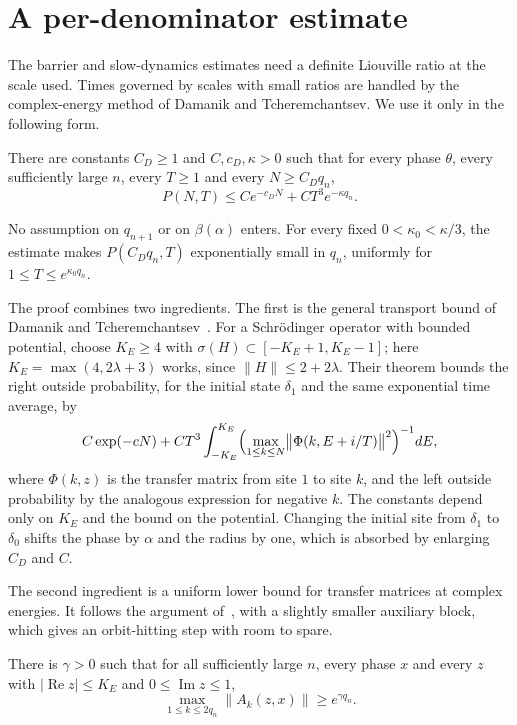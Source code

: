 \section{A per-denominator estimate}\label{sec:dt}

The barrier and slow-dynamics estimates need a definite Liouville ratio at the scale used. Times governed by scales with small ratios are handled by the complex-energy method of Damanik and Tcheremchantsev. We use it only in the following form.

\begin{proposition}\label{prop:dt}
There are constants $C_D\ge1$ and $C,c_D,\kappa>0$ such that for every phase $\theta$, every sufficiently large $n$, every $T\ge1$ and every $N\ge C_Dq_n$,
\[
P(N,T)\le Ce^{-c_DN}+CT^3e^{-\kappa q_n}.
\]
\end{proposition}

No assumption on $q_{n+1}$ or on $\beta(\alpha)$ enters. For every fixed $0<\kappa_0<\kappa/3$, the estimate makes $P(C_Dq_n,T)$ exponentially small in $q_n$, uniformly for $1\le T\le e^{\kappa_0q_n}$.

The proof combines two ingredients. The first is the general transport bound of Damanik and Tcheremchantsev~\cite[Theorem~7]{DT2007}. For a Schr\"odinger operator with bounded potential, choose $K_E\ge4$ with $\sigma(H)\subset[-K_E+1,K_E-1]$; here $K_E=\max(4,2\lambda+3)$ works, since $\|H\|\le2+2\lambda$. Their theorem bounds the right outside probability, for the initial state $\delta_1$ and the same exponential time average, by
\[
C\exp(-cN)+CT^3\int_{-K_E}^{K_E}\Bigl(\max_{1\le k\le N}\bigl\|\Phi(k,E+i/T)\bigr\|^2\Bigr)^{-1}dE,
\]
where $\Phi(k,z)$ is the transfer matrix from site $1$ to site $k$, and the left outside probability by the analogous expression for negative $k$. The constants depend only on $K_E$ and the bound on the potential. Changing the initial site from $\delta_1$ to $\delta_0$ shifts the phase by $\alpha$ and the radius by one, which is absorbed by enlarging $C_D$ and $C$.

The second ingredient is a uniform lower bound for transfer matrices at complex energies. It follows the argument of~\cite[Section~5]{DT2007}, with a slightly smaller auxiliary block, which gives an orbit-hitting step with room to spare.

\begin{lemma}\label{lem:herman}
There is $\gamma>0$ such that for all sufficiently large $n$, every phase $x$ and every $z$ with $|\operatorname{Re}z|\le K_E$ and $0\le\operatorname{Im}z\le1$,
\[
\max_{1\le k\le2q_n}\|A_k(z,x)\|\ge e^{\gamma q_n}.
\]
\end{lemma}

